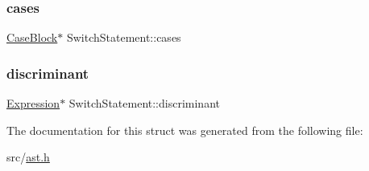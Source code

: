 \subsubsection{\texorpdfstring{cases}{cases}}
{\footnotesize\ttfamily \hyperlink{struct_case_block}{Case\+Block}$\ast$ Switch\+Statement\+::cases}

\mbox{\label{struct_switch_statement_a6b04149d29751485e93c698298ebbe5d}} 
\subsubsection{\texorpdfstring{discriminant}{discriminant}}
{\footnotesize\ttfamily \hyperlink{struct_expression}{Expression}$\ast$ Switch\+Statement\+::discriminant}



The documentation for this struct was generated from the following file\+:\begin{DoxyCompactItemize}
\item 
src/\hyperlink{ast_8h}{ast.\+h}\end{DoxyCompactItemize}
